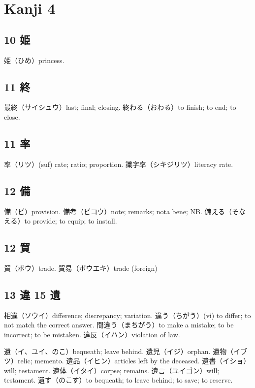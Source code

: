 \chapter{Kanji 4}

\section{10 姫}

姫（ひめ）princess.

\section{11 終}

最終（サイシュウ）last; final; closing.
終わる（おわる）to finish; to end; to close.

\section{11 率}

率（リツ）(suf) rate; ratio; proportion.
識字率（シキジリツ）literacy rate.

\section{12 備}

備（ビ）provision.
備考（ビコウ）note; remarks; nota bene; NB.
備える（そなえる）to provide; to equip; to install.

\section{12 貿}

貿（ボウ）trade.
貿易（ボウエキ）trade (foreign)

\section{13 違 15 遺}

相違（ソウイ）difference; discrepancy; variation.
違う（ちがう）(vi) to differ; to not match the correct answer.
間違う（まちがう）to make a mistake; to be incorrect; to be mistaken.
違反（イハン）violation of law.

遺（イ、ユイ、のこ）bequeath; leave behind.
遺児（イジ）orphan.
遺物（イブツ）relic; memento.
遺品（イヒン）articles left by the deceased.
遺書（イショ）will; testament.
遺体（イタイ）corpse; remains.
遺言（ユイゴン）will; testament.
遺す（のこす）to bequeath; to leave behind; to save; to reserve.


